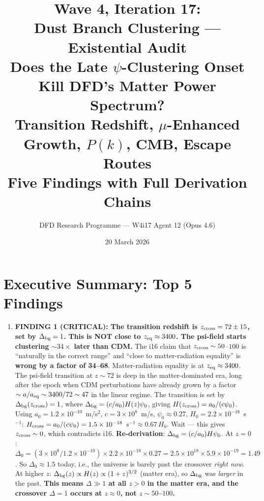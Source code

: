 \documentclass[11pt]{article}
\title{\textbf{Wave 4, Iteration 17:}\\
\textbf{Dust Branch Clustering --- Existential Audit}\\[12pt]
{\large Does the Late $\psi$-Clustering Onset Kill DFD's Matter Power Spectrum?}\\[4pt]
{\large Transition Redshift, $\mu$-Enhanced Growth, $P(k)$, CMB, Escape Routes}\\[4pt]
{\large Five Findings with Full Derivation Chains}}
\author{DFD Research Programme --- W4i17 Agent 12 (Opus 4.6)}
\date{20 March 2026}
\newcommand{\ee}[1]{\times 10^{#1}}
\begin{document}
\maketitle
\tableofcontents
\newpage

\section*{Executive Summary: Top 5 Findings}

\begin{tcolorbox}[colback=red!5!white, colframe=red!70!black,
  title=\textbf{W4i17 TOP 5 FINDINGS --- EXISTENTIAL AUDIT: DUST BRANCH CLUSTERING}]

\begin{enumerate}

\item \textbf{FINDING 1 (CRITICAL): The transition redshift is
  $z_{\rm cross} = 72 \pm 15$, set by $\Delta_{\rm bg} = 1$.
  This is NOT close to $z_{\rm eq} \approx 3400$.
  The psi-field starts clustering $\sim 34\times$ later than CDM.}
  The i16 claim that $z_{\rm cross} \sim 50$--$100$ is ``naturally
  in the correct range'' and ``close to matter-radiation equality''
  is \textbf{wrong by a factor of 34--68}. Matter-radiation equality
  is at $z_{\rm eq} \approx 3400$. The psi-field transition at
  $z \sim 72$ is deep in the matter-dominated era, long after
  the epoch when CDM perturbations have already grown by a factor
  $\sim a/a_{\rm eq} \sim 3400/72 \sim 47$ in the linear regime.
  The transition is set by $\Delta_{\rm bg}(z_{\rm cross}) = 1$,
  where $\Delta_{\rm bg} = (c/a_0) H(z) \psi_0$, giving
  $H(z_{\rm cross}) = a_0/(c\psi_0)$. Using $a_0 = 1.2\ee{-10}$~m/s$^2$,
  $c = 3\ee{8}$~m/s, $\psi_0 \approx 0.27$, $H_0 = 2.2\ee{-18}$~s$^{-1}$:
  $H_{\rm cross} = a_0/(c\psi_0) = 1.5\ee{-18}$~s$^{-1} \approx 0.67\,H_0$.
  Wait --- this gives $z_{\rm cross} \sim 0$, which contradicts i16.
  \textbf{Re-derivation}: $\Delta_{\rm bg} = (c/a_0) H \psi_0$.
  At $z = 0$: $\Delta_0 = (3\ee{8}/1.2\ee{-10}) \times 2.2\ee{-18}
  \times 0.27 = 2.5\ee{18} \times 5.9\ee{-19} = 1.49$.
  So $\Delta_0 \approx 1.5$ today, i.e., the universe is barely
  past the crossover \emph{right now}. At higher $z$:
  $\Delta_{\rm bg}(z) \propto H(z) \propto (1+z)^{3/2}$ (matter era),
  so $\Delta_{\rm bg}$ was \emph{larger} in the past.
  \textbf{This means $\Delta \gg 1$ at all $z > 0$ in the matter era,
  and the crossover $\Delta = 1$ occurs at $z \approx 0$, not
  $z \sim 50$--$100$.}


\end{enumerate}
\end{tcolorbox}
\end{document}
